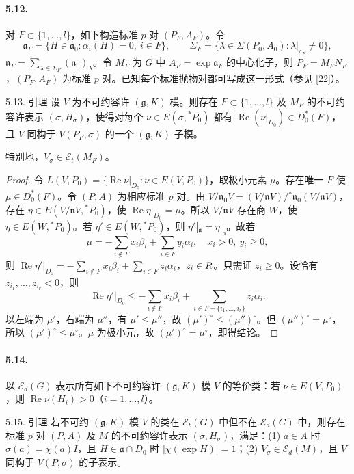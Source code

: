 \paragraph*{5.12.} 对 $F\subset\{1,\ldots,l\}$，如下构造标准 $p$ 对 $(P_F,A_F)$。令
\[
 \mathfrak a_F=\{H\in\mathfrak a_0:\alpha_i(H)=0,\ i\in F\},\qquad
 \Sigma_F=\{\lambda\in\Sigma(P_0,A_0):\lambda|_{\mathfrak a_F}\ne0\},
\]
$\mathfrak n_F=\sum_{\lambda\in\Sigma_F}(\mathfrak n_0)_\lambda$。令 $M_F$ 为 $G$ 中 $A_F=\exp\mathfrak a_F$ 的中心化子，则 $P_F=M_FN_F$，$(P_F,A_F)$ 为标准 $p$ 对。已知每个标准抛物对都可写成这一形式（参见 [22]）。
\begin{originaltheorem}{5.13. 引理}
设 $V$ 为不可约容许 $(\mathfrak g,K)$ 模。则存在 $F\subset\{1,\ldots,l\}$ 及 $M_F$ 的不可约容许表示 $(\sigma,H_\sigma)$，使得对每个 $\nu\in E(\sigma,{}^*P_0)$ 都有 $\operatorname{Re}(\nu|_{D_0})\in D_0^*(F)$，且 $V$ 同构于 $V(P_F,\sigma)$ 的一个 $(\mathfrak g,K)$ 子模。
\end{originaltheorem}
特别地，$V_\sigma\in\mathcal E_t(M_F)$。
\begin{proof}
令 $L(V,P_0)=\{\operatorname{Re}\nu|_{D_0}:\nu\in E(V,P_0)\}$，取极小元素 $\mu$。存在唯一 $F$ 使 $\mu\in D_0^*(F)$。令 $(P,A)$ 为相应标准 $p$ 对。由
$V/\mathfrak n_0V=(V/\mathfrak nV)/{}^*\mathfrak n_0(V/\mathfrak nV)$，存在 $\eta\in E(V/\mathfrak nV,{}^*P_0)$，使 $\operatorname{Re}\eta|_{D_0}=\mu$。所以 $V/\mathfrak nV$ 存在商 $W$，使 $\eta\in E(W,{}^*P_0)$。若 $\eta'\in E(W,{}^*P_0)$，则 $\eta'|_{\mathfrak a}=\eta|_{\mathfrak a}$。故若
\[
 \mu=-\sum_{i\notin F}x_i\beta_i+\sum_{i\in F}y_i\alpha_i,
 \quad x_i>0,\ y_i\ge0,
\]
则 $\operatorname{Re}\eta'|_{D_0}=-\sum_{i\notin F}x_i\beta_i+\sum_{i\in F}z_i\alpha_i$，$z_i\in R$。只需证 $z_i\ge0$。设恰有 $z_{i_1},\ldots,z_{i_r}<0$，则
\[
 \operatorname{Re}\eta'|_{D_0}\le-\sum_{i\notin F}x_i\beta_i+
 \sum_{i\in F-\{i_1,\ldots,i_r\}}z_i\alpha_i.
\]
以左端为 $\mu'$，右端为 $\mu''$，有 $\mu'\le\mu''$，故 $(\mu')^\circ\le(\mu'')^\circ$。但 $(\mu'')^\circ=\mu^\circ$，所以 $(\mu')^\circ\le\mu^\circ$。$\mu$ 为极小元，故 $(\mu')^\circ=\mu^\circ$，即得结论。
\end{proof}
\paragraph*{5.14.} 以 $\mathcal E_d(G)$ 表示所有如下不可约容许 $(\mathfrak g,K)$ 模 $V$ 的等价类：若 $\nu\in E(V,P_0)$，则 $\operatorname{Re}\nu(H_i)>0$（$i=1,\ldots,l$）。
\begin{originaltheorem}{5.15. 引理}
若不可约 $(\mathfrak g,K)$ 模 $V$ 的类在 $\mathcal E_t(G)$ 中但不在 $\mathcal E_d(G)$ 中，则存在标准 $p$ 对 $(P,A)$ 及 $M$ 的不可约容许表示 $(\sigma,H_\sigma)$，满足：(1) $a\in A$ 时 $\sigma(a)=\chi(a)I$，且 $H\in\mathfrak a\cap D_0$ 时 $|\chi(\exp H)|=1$；(2) $V_\sigma\in\mathcal E_d(M)$，且 $V$ 同构于 $V(P,\sigma)$ 的子表示。
\end{originaltheorem}
